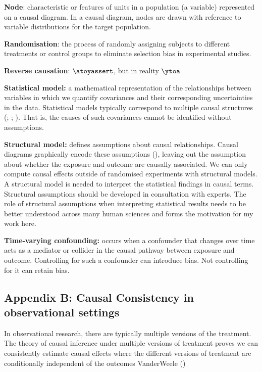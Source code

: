 \documentclass[
  singlecolumn]{article}
\begin{document}
\textbf{Node}: characteristic or features of units in a population (a
variable) represented on a causal diagram. In a causal diagram, nodes
are drawn with reference to variable distributions for the target
population.

\textbf{Randomisation}: the process of randomly assigning subjects to
different treatments or control groups to eliminate selection bias in
experimental studies.

\textbf{Reverse causation}: \(\atoyassert\), but in reality \(\ytoa\)

\textbf{Statistical model:} a mathematical representation of the
relationships between variables in which we quantify covariances and
their corresponding uncertainties in the data. Statistical models
typically correspond to multiple causal structures
(;
;
). That is,
the causes of such covariances cannot be identified without assumptions.

\textbf{Structural model:} defines assumptions about causal
relationships. Causal diagrams graphically encode these assumptions
(), leaving out the
assumption about whether the exposure and outcome are causally
associated. We can only compute causal effects outside of randomised
experiments with structural models. A structural model is needed to
interpret the statistical findings in causal terms. Structural
assumptions should be developed in consultation with experts. The role
of structural assumptions when interpreting statistical results needs to
be better understood across many human sciences and forms the motivation
for my work here.

\textbf{Time-varying confounding:} occurs when a confounder that changes
over time acts as a mediator or collider in the causal pathway between
exposure and outcome. Controlling for such a confounder can introduce
bias. Not controlling for it can retain bias.

\newpage{}

\subsection{Appendix B: Causal Consistency in observational
settings}\label{appendix-b}

In observational research, there are typically multiple versions of the
treatment. The theory of causal inference under multiple versions of
treatment proves we can consistently estimate causal effects where the
different versions of treatment are conditionally independent of the
outcomes VanderWeele ()
\end{document}
